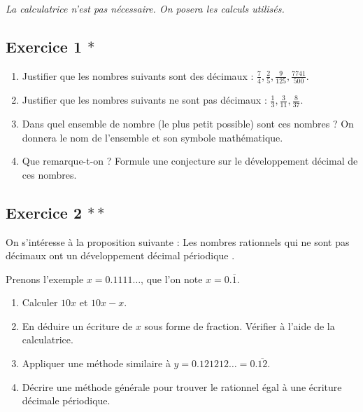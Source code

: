 \documentclass[a4paper,12pt, french, noSujetB]{article}
\date{septembre 2026}
\begin{document}
\emph{La calculatrice n'est pas nécessaire. On posera les calculs utilisés.}

\vspace{-3mm}

\subsection*{Exercice 1 $\ast$}
\begin{enumerate}
    \item Justifier que les nombres suivants sont des décimaux : $\frac{7}{4}, \frac{2}{5}, \frac{9}{125}, \frac{7741}{500}$.
    \item Justifier que les nombres suivants ne sont pas décimaux : $\frac{1}{3}, \frac{3}{11},  \frac{8}{37}$.
    \item Dans quel ensemble de nombre (le plus petit possible) sont ces nombres ? On donnera le nom de l'ensemble et son symbole mathématique.
    \item Que remarque-t-on ? Formule une conjecture sur le développement décimal de ces nombres.
\end{enumerate}

\subsection*{Exercice 2 $\ast\ast$}
On s'intéresse à la proposition suivante : \guillemotleft Les nombres rationnels qui ne sont pas décimaux ont un développement décimal périodique \guillemotright.

Prenons l'exemple $x = 0.1111\dots$, que l'on note $x = 0.\overline{1}$.
\begin{enumerate}
    \item Calculer $10x$ et $10x-x$.
    \item En déduire un écriture de $x$ sous forme de fraction. Vérifier à l'aide de la calculatrice.
    \item Appliquer une méthode similaire à $y=0.121212\dots=0.\overline{12}$.
    \item Décrire une méthode générale pour trouver le rationnel égal à une écriture décimale périodique.
\end{enumerate}
\end{document}
